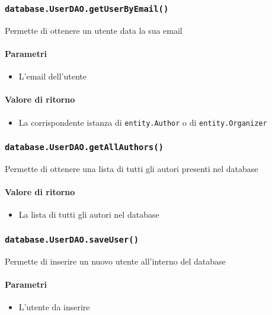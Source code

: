     \subsubsection{\texttt{database.UserDAO.getUserByEmail()}}
    Permette di ottenere un utente data la sua email
    \paragraph{Parametri}
    \begin{itemize}
    \item L'email dell'utente
    \end{itemize}
    \paragraph{Valore di ritorno}
    \begin{itemize}
    \item La corrispondente istanza di \texttt{entity.Author} o di \texttt{entity.Organizer}
    \end{itemize}

    \subsubsection{\texttt{database.UserDAO.getAllAuthors()}}
    Permette di ottenere una lista di tutti gli autori presenti nel database
    \paragraph{Valore di ritorno}
    \begin{itemize}
    \item La lista di tutti gli autori nel database
    \end{itemize}

    \subsubsection{\texttt{database.UserDAO.saveUser()}}
    Permette di inserire un nuovo utente all'interno del database
  \paragraph{Parametri}
  \begin{itemize}
    \item L'utente da inserire
    \end{itemize}
    
